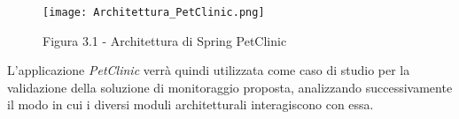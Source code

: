 \begin{figure}[!h] 
    \centering 
    \texttt{[image: Architettura\_PetClinic.png]} 
    \caption{Figura 3.1 - Architettura di Spring PetClinic}
\end{figure}


L'applicazione \emph{PetClinic} verrà quindi utilizzata come caso di studio per la validazione della soluzione di monitoraggio proposta, analizzando successivamente il modo in cui i diversi moduli architetturali interagiscono con essa.

